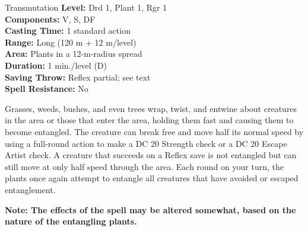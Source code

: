 {Transmutation}
{
	\textbf{Level:}
	Drd 1, Plant 1, Rgr 1\\
	\textbf{Components:}
	V, S, DF\\
	\textbf{Casting Time:}
	1 standard action\\
	\textbf{Range:}
	Long (120 m + 12 m/level)\\
	\textbf{Area:}
	Plants in a 12-m-radius spread\\
	\textbf{Duration:}
	1 min./level (D)\\
	\textbf{Saving Throw:}
	Reflex partial; see text\\
	\textbf{Spell Resistance:}
	No\\
}
{
	Grasses, weeds, bushes, and even trees wrap, twist, and entwine about creatures in the area or those that enter the area, holding them fast and causing them to become entangled. The creature can break free and move half its normal speed by using a full-round action to make a DC 20 Strength check or a DC 20 Escape Artist check. A creature that succeeds on a Reflex save is not entangled but can still move at only half speed through the area. Each round on your turn, the plants once again attempt to entangle all creatures that have avoided or escaped entanglement.

	\textbf{Note: The effects of the spell may be altered somewhat, based on the nature of the entangling plants.}

}
